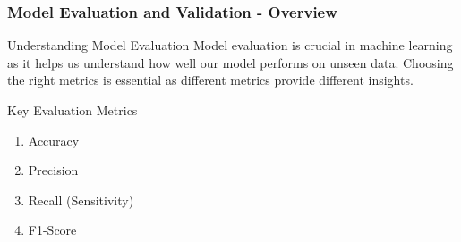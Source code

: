 \documentclass[aspectratio=169]{beamer}
\begin{document}
\begin{frame}[fragile]
    \frametitle{Model Evaluation and Validation - Overview}
    \begin{block}{Understanding Model Evaluation}
        Model evaluation is crucial in machine learning as it helps us understand how well our model performs on unseen data. Choosing the right metrics is essential as different metrics provide different insights.
    \end{block}
    
    \begin{block}{Key Evaluation Metrics}
        \begin{enumerate}
            \item Accuracy
            \item Precision
            \item Recall (Sensitivity)
            \item F1-Score
        \end{enumerate}
    \end{block}
\end{frame}
\end{document}
